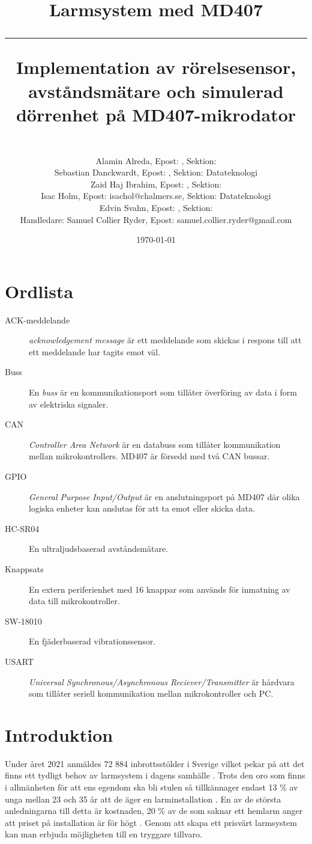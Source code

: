 \documentclass{article}
\title{\textbf{Larmsystem med MD407}\\ 
\hspace{10cm}
\hrule
\hspace{10cm}
Implementation av rörelsesensor, avståndsmätare och simulerad dörrenhet på MD407-mikrodator}
\author{\\Alamin Alreda, Epost: , Sektion: \\Sebastian Danckwardt, Epost: , Sektion: Datateknologi\\Zaid Haj Ibrahim, Epost: , Sektion: \\Isac Holm, Epost: isachol@chalmers.se, Sektion: Datateknologi\\Edvin Svahn, Epost: , Sektion: \\Handledare: Samuel Collier Ryder, Epost: samuel.collier.ryder@gmail.com}
\date{\today}
\begin{document}
\maketitle
\newpage
\tableofcontents
\newpage
\section*{Ordlista}
\begin{description}

\item[ACK-meddelande] \emph{acknowledgement message} är ett meddelande som skickas i respons till att ett meddelande har tagits emot väl.

\item[Buss] En \emph{buss} är en kommunikationsport som tillåter överföring av data i form av elektriska signaler.

\item[CAN] \emph{Controller Area Network} är en databuss som tillåter kommunikation mellan mikrokontrollers. MD407 är försedd med två CAN bussar.

\item[GPIO] \emph{General Purpose Input/Output} är en anslutningsport på MD407 där olika logiska enheter kan anslutas för att ta emot eller skicka data.

\item[HC-SR04] En ultraljudsbaserad avståndsmätare.

\item[Knappsats] En extern periferienhet med 16 knappar som används för inmatning av data till mikrokontroller.

\item[SW-18010] En fjäderbaserad vibrationssensor.

\item[USART] \emph{Universal Synchronous/Asynchronous Reciever/Transmitter} är hårdvara som tillåter seriell kommunikation mellan mikrokontroller och PC.

\end{description}
 \newpage

\setcounter{page}{1}
\section{Introduktion}

Under året 2021 anmäldes 72 884 inbrottsstölder i Sverige vilket pekar på att det finns ett tydligt behov av larmsystem i dagens samhälle \cite{BRa}.
Trots den oro som finns i allmänheten för att ens egendom ska bli stulen så tillkännager endast 13 \% av unga mellan 23 och 35 år att de äger en larminstallation \cite{MoFor}.
En av de största anledningarna till detta är kostnaden, 20 \% av de som saknar ett hemlarm anger att priset på installation är för högt \cite{MoFor}.
Genom att skapa ett prisvärt larmsystem kan man erbjuda möjligheten till en tryggare tillvaro.
\end{document}
